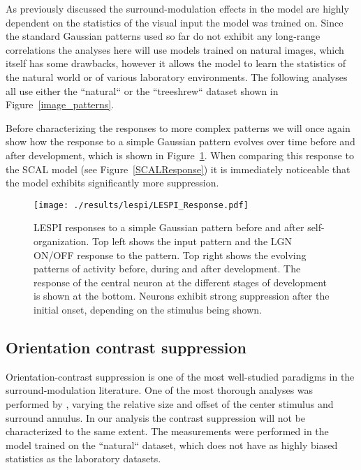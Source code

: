 As previously discussed the surround-modulation effects in the model
are highly dependent on the statistics of the visual input the model
was trained on. Since the standard Gaussian patterns used so far do
not exhibit any long-range correlations the analyses here will use
models trained on natural images, which itself has some drawbacks,
however it allows the model to learn the statistics of the natural
world or of various laboratory environments. The following analyses
all use either the ``natural`` or the ``treeshrew`` dataset shown in
Figure~\ref{image_patterns}.

Before characterizing the responses to more complex patterns we will
once again show how the response to a simple Gaussian pattern evolves
over time before and after development, which is shown in
Figure~\ref{LESPIResponse}. When comparing this response to the SCAL
model (see Figure~\ref{SCALResponse}) it is immediately noticeable
that the model exhibits significantly more suppression.

\begin{figure}
	\centering
    \texttt{[image: ./results/lespi/LESPI\_Response.pdf]}
	\caption[LEPSI responses to a simple Gaussian pattern before and
      after self-organization.]{LESPI responses to a simple Gaussian
      pattern before and after self-organization. Top left shows the
      input pattern and the LGN ON/OFF response to the pattern. Top
      right shows the evolving patterns of activity before, during and
      after development. The response of the central neuron at the
      different stages of development is shown at the bottom. Neurons
      exhibit strong suppression after the initial onset, depending on
      the stimulus being shown.}
	\label{LESPIResponse}
\end{figure}

\subsection{Orientation contrast suppression}

Orientation-contrast suppression is one of the most well-studied
paradigms in the surround-modulation literature. One of the most
thorough analyses was performed by \cite{Jones2002}, varying the
relative size and offset of the center stimulus and surround
annulus. In our analysis the contrast suppression will not be
characterized to the same extent. The measurements were performed in
the model trained on the ``natural`` dataset, which does not have as
highly biased statistics as the laboratory datasets.

